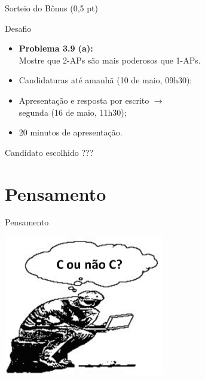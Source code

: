 \documentclass[xcolor=dvipsnames,table]{beamer}
\begin{document}
	\begin{frame}{Sorteio do Bônus (0,5 pt)}
		\begin{block}{Desafio}
			\begin{itemize}
				\item {\bf Problema 3.9 (a):} \\Mostre que 2-APs são mais poderosos que 1-APs. 
                \item Candidaturas até amanhã (10 de maio, 09h30); 
                \item Apresentação e resposta por escrito $\rightarrow$ \\segunda (16 de maio, 11h30); 
                \item 20 minutos de apresentação.
			\end{itemize}
		\end{block} 
        \begin{block}{Candidato escolhido}
        	???
        \end{block}
	\end{frame}
    
    \section{Pensamento}
	\begin{frame}{Pensamento}
  		\begin{center}
    		\includegraphics[width=7cm]{images/pensamento.png}
  		\end{center}
	\end{frame}
	
\end{document}
